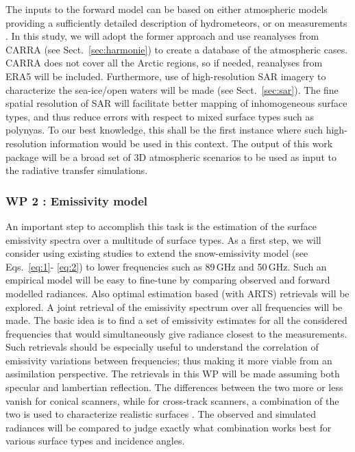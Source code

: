 \documentclass[12pt,oneside,a4paper]{article}
\begin{document}
\label{sec:atmscenes}
The inputs to the forward model can be based on either atmospheric models
providing a sufficiently detailed description of hydrometeors, or on
measurements \citep{ekelund:using:20}. In this study, we will adopt the former
approach and use reanalyses from CARRA (see Sect.~\ref{sec:harmonie}) to create a database of the atmospheric cases. CARRA does not cover all the Arctic regions, so if needed, reanalyses from ERA5 will be included. Furthermore, use of
high-resolution SAR imagery to characterize the sea-ice/open waters will be
made (see Sect.~\ref{sec:sar}). The fine spatial resolution of SAR will facilitate better mapping of
inhomogeneous surface types, and thus reduce errors with respect to mixed
surface types such as polynyas. To our best knowledge, this shall be the first
instance where such high-resolution information would be used in this context.
The output of this work package will be a broad set of 3D atmospheric scenarios
to be used as input to the radiative transfer simulations. \vspace{-1.0ex}

\subsubsection*{WP 2 : Emissivity model}
%
\label{sec:emissivity}
An important step to accomplish this task is the estimation of the surface
emissivity spectra over a multitude of surface types. As a first step, we will
consider using existing studies to extend the snow-emissivity model (see
Eqs.~\ref{eq:1}- \ref{eq:2}) to lower frequencies such as 89\,GHz and 50\,GHz.
Such an empirical model will be easy to fine-tune by comparing observed and
forward modelled radiances. Also optimal estimation based (with ARTS) retrievals will be
explored. A joint retrieval of the emissivity spectrum over all frequencies
will be made. The basic idea is to find a set of emissivity estimates for all
the considered frequencies that would simultaneously give radiance closest to
the measurements. Such retrievals should be especially useful to understand
the correlation of emissivity variations between frequencies; thus making it
more viable from an assimilation perspective. The retrievals in this WP will be
made assuming both specular and lambertian reflection. The differences between
the two more or less vanish for conical scanners, while for cross-track
scanners, a combination of the two is used to characterize realistic surfaces
\citep{matzler:2005:onthe}. The observed and simulated radiances will be compared to judge exactly what combination works best for various surface types and incidence angles.
\end{document}
